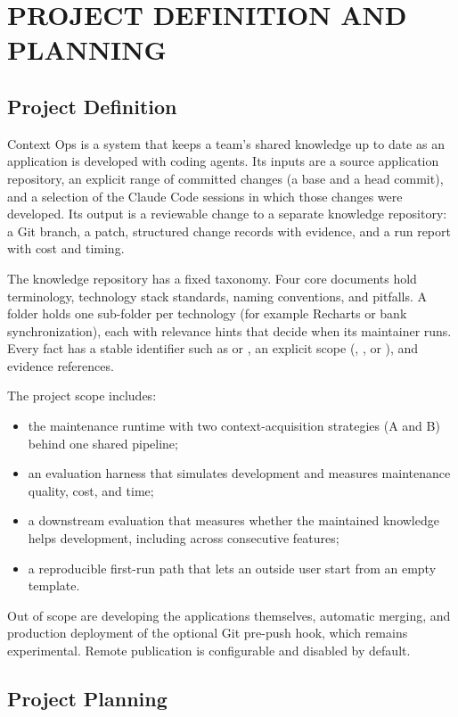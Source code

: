 \chapter{PROJECT DEFINITION AND PLANNING}

\section{Project Definition}

Context Ops is a system that keeps a team's shared knowledge up to date as an application is developed with coding agents. Its inputs are a source application repository, an explicit range of committed changes (a base and a head commit), and a selection of the Claude Code sessions in which those changes were developed. Its output is a reviewable change to a separate knowledge repository: a Git branch, a patch, structured change records with evidence, and a run report with cost and timing.

The knowledge repository has a fixed taxonomy. Four core documents hold terminology, technology stack standards, naming conventions, and pitfalls. A  folder holds one sub-folder per technology (for example Recharts or bank synchronization), each with relevance hints that decide when its maintainer runs. Every fact has a stable identifier such as  or , an explicit scope (, , or ), and evidence references.

The project scope includes:
\begin{itemize}[nosep]
  \item the maintenance runtime with two context-acquisition strategies (A and B) behind one shared pipeline;
  \item an evaluation harness that simulates development and measures maintenance quality, cost, and time;
  \item a downstream evaluation that measures whether the maintained knowledge helps development, including across consecutive features;
  \item a reproducible first-run path that lets an outside user start from an empty template.
\end{itemize}
Out of scope are developing the applications themselves, automatic merging, and production deployment of the optional Git pre-push hook, which remains experimental. Remote publication is configurable and disabled by default.

\section{Project Planning}

